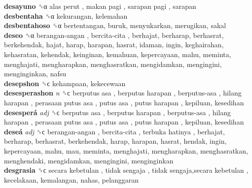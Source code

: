 \textbf{desayuno} ␝α   alas perut ,  makan pagi ,  sarapan pagi , sarapan  \\
\textbf{desbentaha} ␝α  kekurangan, kelemahan  \\
\textbf{desbentahoso} ␝α  bertentangan, buruk, menyukarkan, merugikan, sakal  \\
\textbf{deseo} ␝α   berangan-angan ,  bercita-cita , berhajat, berharap, berhasrat, berkehendak, hajat, harap, harapan, hasrat, idaman, ingin, keghairahan, kehasratan, kehendak, keinginan, kemahuan, kepercayaan, mahu, meminta, menghajati, mengharapkan, menghasratkan, mengidamkan, mengingini, menginginkan, nafsu  \\
\textbf{desepshon} ␝ϲ  kehampaan, kekecewaan  \\
\textbf{desesperashon} \emph{n}  ␝ϲ   berputus asa ,  berputus harapan ,  berputus-asa ,  hilang harapan ,  perasaan putus asa ,  putus asa ,  putus harapan , kepiluan, kesedihan  \\
\textbf{desesperá} \emph{adj}  ␝ϲ   berputus asa ,  berputus harapan ,  berputus-asa ,  hilang harapan ,  perasaan putus asa ,  putus asa ,  putus harapan , kepiluan, kesedihan  \\
\textbf{deseá} \emph{adj}  ␝ϲ   berangan-angan ,  bercita-cita ,  terbuka hatinya , berhajat, berharap, berhasrat, berkehendak, harap, harapan, hasrat, hendak, ingin, kepercayaan, mahu, mau, meminta, menghajati, mengharapkan, menghasratkan, menghendaki, mengidamkan, mengingini, menginginkan  \\
\textbf{desgrasia} ␝ϲ   secara kebetulan ,  tidak sengaja ,  tidak sengaja,secara kebetulan , kecelakaan, kemalangan, nahas, pelanggaran  \\
